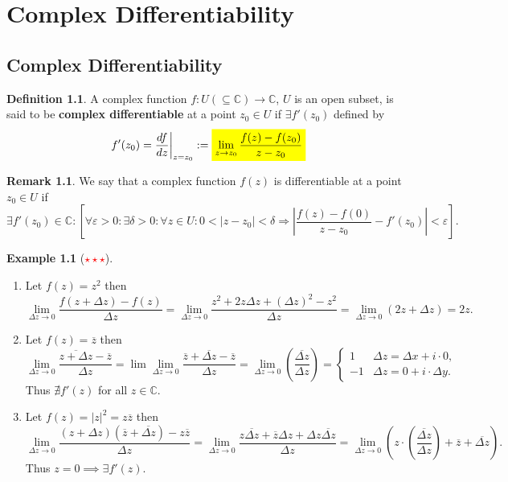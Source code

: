 \documentclass[12pt,openany]{book}
\newcommand{\mathcolorbox}[2]{\colorbox{#1}{$\displaystyle #2$}}
\theoremstyle{definition}
\newtheorem{definition}{Definition}[chapter]
\newtheorem{remark}{Remark}[section]
\newtheorem{example}{Example}[section]
\newcommand{\C}{\mathbb{C}}
\newcommand{\of}[1]{\left( #1 \right)}
\newcommand{\abs}[1]{\left\lvert #1 \right\rvert}
\newcommand{\conjugate}[1]{\overline{#1}}
\begin{document}
	\newpage
	\chapter{Complex Differentiability}
	
	\section{Complex Differentiability}
	\begin{tcolorbox}[colback=white,colframe=defcolor,arc=5pt,title={\color{white}\bf Complex Differentiability}]
		\begin{definition}
			A complex function $f:U(\subseteq\C)\to\C$, $U$ is an open subset, is said to be \textbf{complex differentiable} at a point $z_0\in U$ if $\exists f'(z_0)$ defined by\[
			f'(z_0)=\frac{df}{dz}\bigg|_{z=z_0}:=\mathcolorbox{-blue}{\lim_{z\to z_0}\frac{f(z)-f(z_0)}{z-z_0}}
			\]
		\end{definition}
	\end{tcolorbox}
	\begin{remark}
		We say that a complex function $f(z)$ is differentiable at a point $z_0\in U$ if \[
		\exists f'\of{z_0}\in\C:\left[\forall\varepsilon>0:\exists\delta>0:\forall z\in U:0<\abs{z-z_0}<\delta\Rightarrow\abs{\frac{f(z)-f(0)}{z-z_0}-f'(z_0)}<\varepsilon\right].
		\] 
	\end{remark}
	\vspace{8pt}
	\begin{example}[\textcolor{red}{$\star\star\star$}]
		\ \begin{enumerate}[(1)]
			\item Let $f\of{z}=z^2$ then \[
			\lim\limits_{\Delta z\to 0}\frac{f(z+\Delta z)-f(z)}{\Delta z}=\lim\limits_{\Delta z\to 0}\frac{z^2+2z\Delta z+(\Delta z)^2-z^2}{\Delta z}=\lim\limits_{\Delta z\to 0}(2z+\Delta z)=2z.
			\]
			\item Let $f\of{z}=\conjugate{z}$ then \[
			\lim\limits_{\Delta z\to 0}\frac{\conjugate{z+\Delta z}-\conjugate{z}}{\Delta z}=\lim\lim_{\Delta z\to 0}\frac{\conjugate{z}+\conjugate{\Delta z}-\conjugate{z}}{\Delta z}=\lim\limits_{\Delta z\to 0}\of{\frac{\conjugate{\Delta z}}{\Delta z}}=\begin{cases}
			1 &\Delta z=\Delta x+i\cdot 0,\\
			-1 &\Delta z= 0+i\cdot\Delta y.
			\end{cases}
			\] Thus $\nexists f'(z)$ for all $z\in\C$.
			\item Let $f\of{z}=\abs{z}^2=z\conjugate{z}$ then\[
			\lim\limits_{\Delta z\to 0}\frac{(z+\Delta z)(\conjugate{z}+\conjugate{\Delta z})-z\conjugate{z}}{\Delta z}=\lim\limits_{\Delta z\to 0}\frac{z\conjugate{\Delta z}+\conjugate{z}\Delta z+\Delta z\conjugate{\Delta z}}{\Delta z}=\lim\limits_{\Delta z\to 0}\of{z\cdot\of{\frac{\conjugate{\Delta z}}{\Delta z}}+\conjugate{z}+\conjugate{\Delta z}}.
			\] Thus $z=0\implies\exists f'(z)$.
		\end{enumerate}
	\end{example}
	
\end{document}
